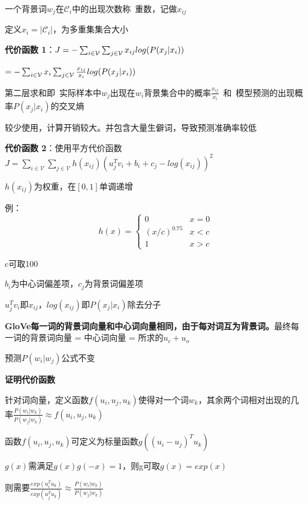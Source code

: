 \documentclass[UTF8]{ctexart}
\begin{document}
  \quad 一个背景词$w_j$在$\mathcal{C}_i$中的出现次数称\ 重数，记做$x_{ij}$

  \quad 定义$x_i = |\mathcal{C}_i|$，为多重集集合大小

  \textbf{代价函数 1}：$J = -\sum_{i\in \mathcal{V} }\sum_{j\in \mathcal{V} }x_{ij} \space log(P(x_j | x_i))$  

  \quad $= -\sum_{i\in \mathcal{V} }x_{i} \sum_{j\in \mathcal{V} } \frac{x_{ij}}{x_i}\space log(P(x_j | x_i))$

  \quad 第二层求和即\ 实际样本中$w_j$出现在$w_i$背景集合中的概率$\frac{x_{ij}}{x_i}$\ 和\ 模型预测的出现概率$P(x_j | x_i)$的交叉熵

  \quad * 较少使用，计算开销较大。并包含大量生僻词，导致预测准确率较低

  \textbf{代价函数 2}：使用平方代价函数$J = \sum_{i \in \mathcal{V}}\sum_{j \in \mathcal{V}}h(x_{ij})(u_j^Tv_i + b_i + c_j -log(x_{ij}))^2$

  \quad $h(x_{ij})$为权重，在$[0, 1]$单调递增

  \quad \quad 例：\begin{equation*}
    h(x) = \begin{cases}
    0 & x = 0\\
    (x / c)^{0.75} & x < c\\
    1 & x > c
    \end{cases}
  \end{equation*}

  \quad \quad c可取100

  \quad $b_i$为中心词偏差项，$c_j$为背景词偏差项

  \quad $u_j^Tv_i$即$x_{ij}$，$log(x_{ij})$即$P(x_j|x_i)$除去分子
  
  \textbf{GloVe每一词的背景词向量和中心词向量相同，由于每对词互为背景词。}最终每一词的背景词向量 = 中心词向量 = 所求的$u_c + u_o$
  
  \quad 预测$P(w_i | w_j)$公式不变
  
  \textbf{证明代价函数}
  
  \quad 针对词向量，定义函数$f(u_i, u_j, u_k)$使得对一个词$w_k$，其余两个词相对出现的几率$\frac{P(w_i | w_k)}{P(w_j | w_k)} \approx f(u_i, u_j, u_k)$
  
  \quad \quad 函数$f(u_i, u_j, u_k)$可定义为标量函数$g((u_i - u_j)^Tu_k)$
  
  \quad \quad $g(x)$需满足$g(x)g(-x) = 1$，则g可取$g(x) = exp(x)$
  
  \quad 则需要$\frac{exp(u_i^Tu_k)}{exp(u_j^Tu_k)} \approx \frac{P(w_i | w_k)}{P(w_j | w_k)}$
\end{document}
